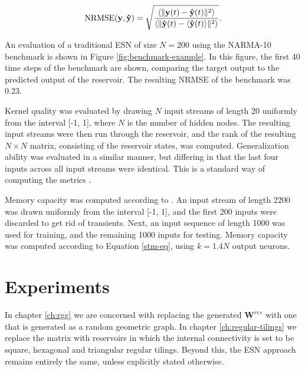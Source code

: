 \begin{equation}
  \textrm{NRMSE}(\mathbf{y}, \mathbf{\hat{y}}) = \sqrt{\frac{
      \langle\Vert \mathbf{y}(t) - \mathbf{\hat{y}}(t) \Vert^{2}\rangle
    }{
      \langle\Vert \mathbf{\hat{y}}(t) - \langle\mathbf{\hat{y}}(t)\rangle \Vert^{2}\rangle
    }
  }
  .
  \label{eq:nrmse}
\end{equation}

An evaluation of a traditional ESN of size $N = 200$ using the NARMA-10
benchmark is shown in Figure \ref{fig:benchmark-example}. In this figure, the
first 40 time steps of the benchmark are shown, comparing the target output to
the predicted output of the reservoir. The resulting NRMSE of the benchmark was
0.23.

Kernel quality was evaluated by drawing $N$ input streams of length 20 uniformly
from the interval [-1, 1], where $N$ is the number of hidden nodes. The
resulting input streams were then run through the reservoir, and the rank of the
resulting $N \times N$ matrix, consisting of the reservoir states, was
computed. Generalization ability was evaluated in a similar manner, but
differing in that the last four inputs across all input streams were
identical. This is a standard way of computing the metrics
\cite{busing_connectivity_2010}.

Memory capacity was computed according to \cite{farkas_computational_2016}. An
input stream of length 2200 was drawn uniformly from the interval [-1, 1], and
the first 200 inputs were discarded to get rid of transients. Next, an input
sequence of length 1000 was used for training, and the remaining 1000 inputs for
testing. Memory capacity was computed according to Equation \ref{stm-eq}, using
$k = 1.4N$ output neurons.

\section{Experiments}

In chapter \ref{ch:rgg} we are concerned with replacing the generated
$\mathbf{W}^{res}$ with one that is generated as a random geometric graph. In
chapter \ref{ch:regular-tilings} we replace the matrix with reservoirs in which
the internal connectivity is set to be square, hexagonal and triangular regular
tilings. Beyond this, the ESN approach remains entirely the same, unless
explicitly stated otherwise.


